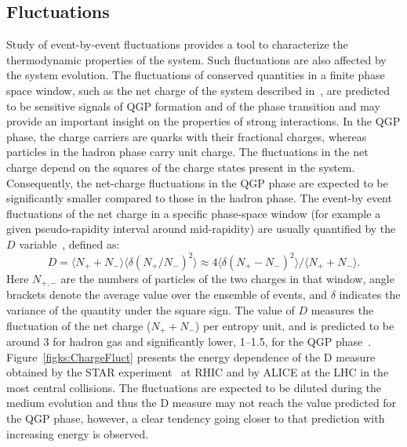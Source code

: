 \subsection{Fluctuations}
\label{subsecks:fluct}
Study of event-by-event fluctuations provides a tool to characterize the thermodynamic properties of the system. Such fluctuations are also affected by the system evolution. The fluctuations of conserved quantities in a finite phase space window, such as the net charge of the system described in~\cite{Abelev:2012pv}, are predicted to be sensitive signals of QGP formation and of the phase transition and may provide an important insight on the properties of strong interactions. In the QGP phase, the charge carriers are quarks with their fractional charges, whereas particles in the hadron phase carry unit charge. The fluctuations in the net charge depend on the squares of the charge states present in the system. Consequently, the net-charge fluctuations in the QGP phase are expected to be significantly smaller compared to those in the hadron phase. The event-by event fluctuations of the net charge in a specific phase-space window (for example a given pseudo-rapidity interval around mid-rapidity) are usually quantified by the $D$ variable~\cite{Jeon:2000wg}, defined as:
\begin{equation}
D = \langle N_{+} + N_{-} \rangle \langle \delta (N_{+} / N_{-})^2 \rangle \approx 4 \langle \delta (N_{+} - N_{-})^2 \rangle / \langle N_{+} + N_{-} \rangle .
\end{equation}
Here $N_{+,-}$ are the numbers of particles of the two charges in that window, angle brackets denote the average value over the ensemble of events, and $\delta$ indicates the variance of the quantity under the square sign. The value of $D$ measures the fluctuation of the net charge ($N_{+} + N_{-}$) per entropy unit, and is predicted to be around 3 for hadron gas and significantly lower, 1--1.5, for the QGP phase~\cite{Jeon:2003gk}. Figure~\ref{figks:ChargeFluct} presents the energy dependence of the D measure obtained by the STAR experiment~\cite{Abelev:2008jg} at RHIC and by ALICE at the LHC in the most central collisions. The fluctuations are expected to be diluted during the medium evolution and thus the D measure may not reach the value predicted for the QGP phase, however, a clear tendency going closer to that prediction with increasing energy is observed.


